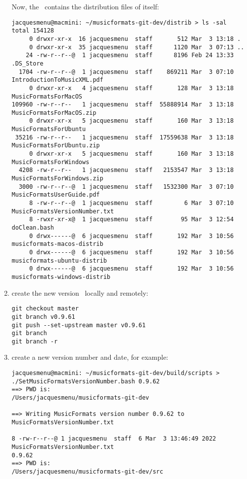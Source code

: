 \begin{enumerate}
Now, the \masterBranch\ contains the distribution files of itself:
\begin{lstlisting}[language=TerminalSmall]
jacquesmenu@macmini: ~/musicformats-git-dev/distrib > ls -sal
total 154128
     0 drwxr-xr-x  16 jacquesmenu  staff       512 Mar  3 13:18 .
     0 drwxr-xr-x  35 jacquesmenu  staff      1120 Mar  3 07:13 ..
    24 -rw-r--r--@  1 jacquesmenu  staff      8196 Feb 24 13:33 .DS_Store
  1704 -rw-r--r--@  1 jacquesmenu  staff    869211 Mar  3 07:10 IntroductionToMusicXML.pdf
     0 drwxr-xr-x   4 jacquesmenu  staff       128 Mar  3 13:18 MusicFormatsForMacOS
109960 -rw-r--r--   1 jacquesmenu  staff  55888914 Mar  3 13:18 MusicFormatsForMacOS.zip
     0 drwxr-xr-x   5 jacquesmenu  staff       160 Mar  3 13:18 MusicFormatsForUbuntu
 35216 -rw-r--r--   1 jacquesmenu  staff  17559638 Mar  3 13:18 MusicFormatsForUbuntu.zip
     0 drwxr-xr-x   5 jacquesmenu  staff       160 Mar  3 13:18 MusicFormatsForWindows
  4208 -rw-r--r--   1 jacquesmenu  staff   2153547 Mar  3 13:18 MusicFormatsForWindows.zip
  3000 -rw-r--r--@  1 jacquesmenu  staff   1532300 Mar  3 07:10 MusicFormatsUserGuide.pdf
     8 -rw-r--r--@  1 jacquesmenu  staff         6 Mar  3 07:10 MusicFormatsVersionNumber.txt
     8 -rwxr-xr-x@  1 jacquesmenu  staff        95 Mar  3 12:54 doClean.bash
     0 drwx------@  6 jacquesmenu  staff       192 Mar  3 10:56 musicformats-macos-distrib
     0 drwx------@  6 jacquesmenu  staff       192 Mar  3 10:56 musicformats-ubuntu-distrib
     0 drwx------@  6 jacquesmenu  staff       192 Mar  3 10:56 musicformats-windows-distrib
\end{lstlisting}

\item create the new version \branch\ locally and remotely:
\begin{lstlisting}[language=TerminalSmall]
git checkout master
git branch v0.9.61
git push --set-upstream master v0.9.61
git branch
git branch -r
\end{lstlisting}

\item create a new version number and date, for example:
\begin{lstlisting}[language=TerminalSmall]
jacquesmenu@macmini: ~/musicformats-git-dev/build/scripts > ./SetMusicFormatsVersionNumber.bash 0.9.62
==> PWD is:
/Users/jacquesmenu/musicformats-git-dev

==> Writing MusicFormats version number 0.9.62 to MusicFormatsVersionNumber.txt

8 -rw-r--r--@ 1 jacquesmenu  staff  6 Mar  3 13:46:49 2022 MusicFormatsVersionNumber.txt
0.9.62
==> PWD is:
/Users/jacquesmenu/musicformats-git-dev/src


\end{lstlisting}
\end{enumerate}
